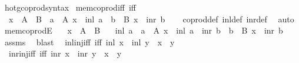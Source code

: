 \begin{isabellebody}
\isamarkupfalse%
\ hotg{\isacharunderscore}{\kern0pt}coprod{\isacharunderscore}{\kern0pt}syntax\isanewline
\isanewline
{}\isamarkupfalse%
\ mem{\isacharunderscore}{\kern0pt}coprod{\isacharunderscore}{\kern0pt}iff\ {\isacharbrackleft}{\kern0pt}iff{\isacharbrackright}{\kern0pt}{\isacharcolon}{\kern0pt}\isanewline
\ \ {\isachardoublequoteopen}x\ {\isasymin}\ A\ {\isasymCoprod}\ B\ {\isasymlongleftrightarrow}\ {\isacharparenleft}{\kern0pt}{\isasymexists}a\ {\isasymin}\ A{\isachardot}{\kern0pt}\ x\ {\isacharequal}{\kern0pt}\ inl\ a{\isacharparenright}{\kern0pt}\ {\isasymor}\ {\isacharparenleft}{\kern0pt}{\isasymexists}b\ {\isasymin}\ B{\isachardot}{\kern0pt}\ x\ {\isacharequal}{\kern0pt}\ inr\ b{\isacharparenright}{\kern0pt}{\isachardoublequoteclose}\isanewline
%
\isadelimproof
\ \ %
\endisadelimproof
%
\isatagproof
{}\isamarkupfalse%
\ coprod{\isacharunderscore}{\kern0pt}def\ inl{\isacharunderscore}{\kern0pt}def\ inr{\isacharunderscore}{\kern0pt}def\ \isamarkupfalse%
\ auto%
\endisatagproof
{\isafoldproof}%
%
\isadelimproof
\isanewline
%
\endisadelimproof
\isanewline
{}\isamarkupfalse%
\ mem{\isacharunderscore}{\kern0pt}coprodE{\isacharcolon}{\kern0pt}\isanewline
\ \ \ {\isachardoublequoteopen}x\ {\isasymin}\ A\ {\isasymCoprod}\ B{\isachardoublequoteclose}\isanewline
\ \ \ {\isacharparenleft}{\kern0pt}inl{\isacharparenright}{\kern0pt}\ a\ \ {\isachardoublequoteopen}a\ {\isasymin}\ A{\isachardoublequoteclose}\ {\isachardoublequoteopen}x\ {\isacharequal}{\kern0pt}\ inl\ a{\isachardoublequoteclose}\ {\isacharbar}{\kern0pt}\ {\isacharparenleft}{\kern0pt}inr{\isacharparenright}{\kern0pt}\ b\ \ {\isachardoublequoteopen}b\ {\isasymin}\ B{\isachardoublequoteclose}\ {\isachardoublequoteopen}x\ {\isacharequal}{\kern0pt}\ inr\ b{\isachardoublequoteclose}\isanewline
%
\isadelimproof
\ \ %
\endisadelimproof
%
\isatagproof
{}\isamarkupfalse%
\ assms\ \isamarkupfalse%
\ blast%
\endisatagproof
{\isafoldproof}%
%
\isadelimproof
\isanewline
%
\endisadelimproof
\isanewline
{}\isamarkupfalse%
\isanewline
\ \ inl{\isacharunderscore}{\kern0pt}inj{\isacharunderscore}{\kern0pt}iff\ {\isacharbrackleft}{\kern0pt}iff{\isacharbrackright}{\kern0pt}{\isacharcolon}{\kern0pt}\ {\isachardoublequoteopen}inl\ x\ {\isacharequal}{\kern0pt}\ inl\ y\ {\isasymlongleftrightarrow}\ x\ {\isacharequal}{\kern0pt}\ y{\isachardoublequoteclose}\ \isanewline
\ \ inr{\isacharunderscore}{\kern0pt}inj{\isacharunderscore}{\kern0pt}iff\ {\isacharbrackleft}{\kern0pt}iff{\isacharbrackright}{\kern0pt}{\isacharcolon}{\kern0pt}\ {\isachardoublequoteopen}inr\ x\ {\isacharequal}{\kern0pt}\ inr\ y\ {\isasymlongleftrightarrow}\ x\ {\isacharequal}{\kern0pt}\ y{\isachardoublequoteclose}\ \isanewline

\end{isabellebody}
